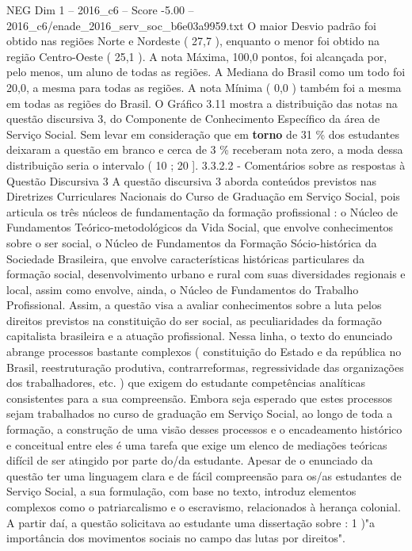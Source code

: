 \begin{textsample}{NEG Dim 1 – 2016\_c6 – Score -5.00 – 2016\_c6/enade\_2016\_serv\_soc\_b6e03a9959.txt}
O maior Desvio padrão foi obtido nas regiões Norte e Nordeste ( 27,7 ), enquanto o menor foi obtido na região Centro-Oeste ( 25,1 ).
A nota Máxima, 100,0 pontos, foi alcançada por, pelo menos, um aluno de todas as regiões.
A Mediana do Brasil como um todo foi 20,0, a mesma para todas as regiões.
A nota Mínima ( 0,0 ) também foi a mesma em todas as regiões do Brasil.
O Gráfico 3.11 mostra a distribuição das notas na questão discursiva 3, do Componente de Conhecimento Específico da área de Serviço Social.
Sem levar em consideração que em \textbf{torno} de 31 \% dos estudantes deixaram a questão em branco e cerca de 3 \% receberam nota zero, a moda dessa distribuição seria o intervalo ( 10 ; 20 ]. 3.3.2.2 - Comentários sobre as respostas à Questão Discursiva 3 A questão discursiva 3 aborda conteúdos previstos nas Diretrizes Curriculares Nacionais do Curso de Graduação em Serviço Social, pois articula os três núcleos de fundamentação da formação profissional : o Núcleo de Fundamentos Teórico-metodológicos da Vida Social, que envolve conhecimentos sobre o ser social, o Núcleo de Fundamentos da Formação Sócio-histórica da Sociedade Brasileira, que envolve características históricas particulares da formação social, desenvolvimento urbano e rural com suas diversidades regionais e local, assim como envolve, ainda, o Núcleo de Fundamentos do Trabalho Profissional.
Assim, a questão visa a avaliar conhecimentos sobre a luta pelos direitos previstos na constituição do ser social, as peculiaridades da formação capitalista brasileira e a atuação profissional.
Nessa linha, o texto do enunciado abrange processos bastante complexos ( constituição do Estado e da república no Brasil, reestruturação produtiva, contrarreformas, regressividade das organizações dos trabalhadores, etc. ) que exigem do estudante competências analíticas consistentes para a sua compreensão.
Embora seja esperado que estes processos sejam trabalhados no curso de graduação em Serviço Social, ao longo de toda a formação, a construção de uma visão desses processos e o encadeamento histórico e conceitual entre eles é uma tarefa que exige um elenco de mediações teóricas difícil de ser atingido por parte do/da estudante.
Apesar de o enunciado da questão ter uma linguagem clara e de fácil compreensão para os/as estudantes de Serviço Social, a sua formulação, com base no texto, introduz elementos complexos como o patriarcalismo e o escravismo, relacionados à herança colonial.
A partir daí, a questão solicitava ao estudante uma dissertação sobre : 1 )"a importância dos movimentos sociais no campo das lutas por direitos".

\end{textsample}
